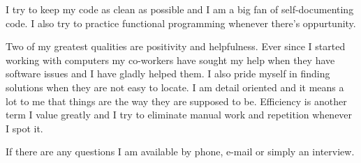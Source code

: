 \documentclass[11pt,a4paper,sans]{moderncv}
\begin{document}
{    I try to keep my code as clean as possible and I am a big fan of self-documenting code. I also try to practice functional programming whenever there's oppurtunity.

    Two of my greatest qualities are positivity and helpfulness. Ever since I started working with computers my co-workers have sought my help when they have software issues and I have gladly helped them. I also pride myself in finding solutions when they are not easy to locate. I am detail oriented and it means a lot to me that things are the way they are supposed to be. Efficiency is another term I value greatly and I try to eliminate manual work and repetition whenever I spot it.
    
    If there are any questions I am available by phone, e-mail or simply an interview.
    
    \makeletterclosing
}
\end{document}
